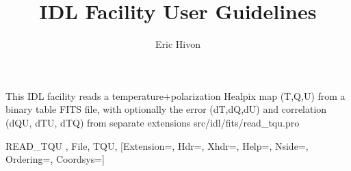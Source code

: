 

\renewcommand{\facname}{{read\_tqu }}
\renewcommand{\FACNAME}{{READ\_TQU }}
\sloppy

\title{\healpix IDL Facility User Guidelines}
 \section[read\_tqu]{ }
\label{idl:read_tqu}
\author{Eric Hivon}

\begin{facility}
{This IDL facility reads a temperature+polarization Healpix map
(T,Q,U) from a binary table FITS file, 
with optionally the error (dT,dQ,dU) and correlation (dQU, dTU, dTQ)
from separate extensions
}
{src/idl/fits/read\_tqu.pro}
\end{facility}

\begin{IDLformat}
{\FACNAME, File, TQU, [Extension=, Hdr=, Xhdr=, Help=, Nside=, Ordering=, Coordsys=]}
\end{IDLformat}


